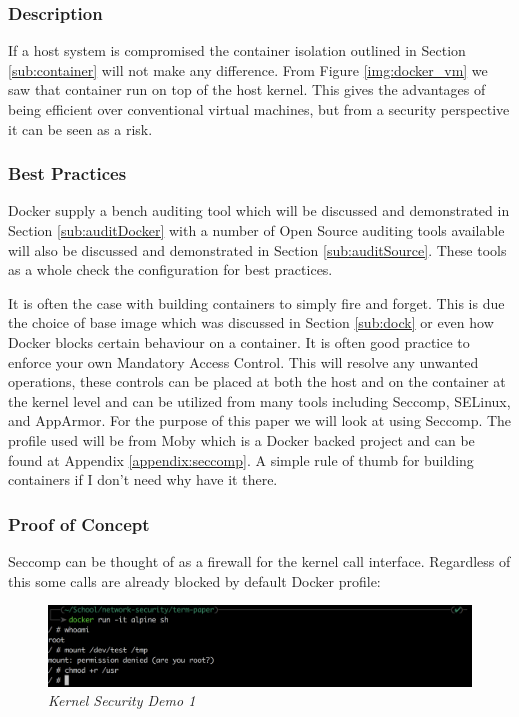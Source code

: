 \subsubsection{Description}
If a host system is compromised the container isolation outlined in Section \ref{sub:container} will not make any difference. From Figure \ref{img:docker_vm} we saw that container run on top of the host kernel. This gives the advantages of being efficient over conventional virtual machines, but from a security perspective it can be seen as a risk.
\subsubsection{Best Practices}
Docker supply a bench auditing tool which will be discussed and demonstrated in Section \ref{sub:auditDocker} with a number of Open Source auditing tools available will also be discussed and demonstrated in Section \ref{sub:auditSource}. These tools as a whole check the configuration for best practices. 

It is often the case with building containers to simply fire and forget. This is due the choice of base image which was discussed in Section \ref{sub:dock} or even how Docker blocks certain behaviour on a container. It is often good practice to enforce your own Mandatory Access Control. This will resolve any unwanted operations, these controls can be placed at both the host and on the container at the kernel level and can be utilized from many tools including Seccomp, SELinux, and AppArmor. For the purpose of this paper we will look at using Seccomp. The profile used will be from Moby which is a Docker backed project and can be found at Appendix \ref{appendix:seccomp}. A simple rule of thumb for building containers if I don't need why have it there.

\subsubsection{Proof of Concept}
Seccomp can be thought of as a firewall for the kernel call interface. Regardless of this some calls are already blocked by default Docker profile:
\begin{figure}[!ht]
\centering
\includegraphics*[width=\textwidth]{images/term1.png}
\caption{\em Kernel Security Demo 1}
\label{img:demo1}
\end{figure}

